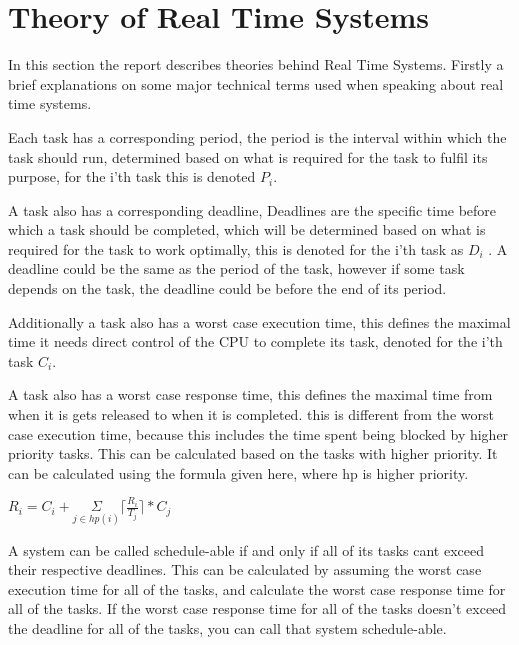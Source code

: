\section{Theory of Real Time Systems}
In this section the report describes theories behind Real Time Systems. Firstly a brief explanations on some major technical terms used when speaking about real time systems. 

Each task has a corresponding period, the period is the interval within which the task should run, determined based on what is required for the task to fulfil its purpose, for the i'th task this is denoted $P_{i}$.

A task also has a corresponding deadline, Deadlines are the specific time before which a task should be completed, which will be determined based on what is required for the task to work optimally, this is denoted for the i'th task as $ D_{i} $ . A deadline could be the same as the period of the task, however if some task depends on the task, the deadline could be before the end of its period. 

Additionally a task also has a worst case execution time, this defines the maximal time it needs direct control of the CPU to complete its task, denoted for the i'th task $C_{i}$.

A task also has a worst case response time, this defines the maximal time from when it is gets released to when it is completed. this is different from the worst case execution time, because this includes the time spent being blocked by higher priority tasks. This can be calculated based on the tasks with higher priority. It can be calculated using the formula given here, where hp is higher priority.

$R_{i} = C_{i} + \underset{j\in hp(i)}{\Sigma} \lceil\frac{R_{i}}{T_{j}}\rceil*C_{j} $

A system can be called schedule-able if and only if all of its tasks cant exceed their respective deadlines. This can be calculated by assuming the worst case execution time for all of the tasks, and calculate the worst case response time for all of the tasks. If the worst case response time for all of the tasks doesn't exceed the deadline for all of the tasks, you can call that system schedule-able. 


